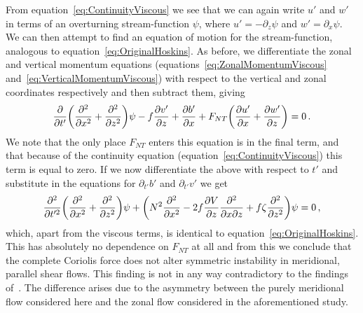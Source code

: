     From equation~\ref{eq:ContinuityViscous} we see that we can again write $u'$ and $w'$ in terms of an overturning stream-function $\psi$, where $u' = - \partial_z \psi$ and $w' = \partial_x \psi$. We can then attempt to find an equation of motion for the stream-function, analogous to equation~\ref{eq:OriginalHoskins}. As before, we differentiate the zonal and vertical momentum equations (equations~\ref{eq:ZonalMomentumViscous} and~\ref{eq:VerticalMomentumViscous}) with respect to the vertical and zonal coordinates respectively and then subtract them, giving
    \begin{equation}
        \pdv{}{t'} \bigg( \pdv[2]{x} + \pdv[2]{z} \bigg) \psi - f \pdv{v'}{z} + \pdv{b'}{x} + F_{NT} \bigg( \pdv{u'}{x} + \pdv{w'}{z} \bigg) = 0 \, .
    \end{equation}
    We note that the only place $F_{NT}$ enters this equation is in the final term, and that because of the continuity equation (equation~\ref{eq:ContinuityViscous}) this term is equal to zero. If we now differentiate the above with respect to $t'$ and substitute in the equations for $\partial_{t'}b'$ and $\partial_{t'}v'$ we get
    \begin{equation}
        \frac{\partial^2}{\partial t'^2} \bigg(\pdv[2]{}{x} + \pdv[2]{}{z}\bigg) \psi + \bigg( N^2 \pdv[2]{}{x} - 2 f \pdv{V}{z} \pdv[2]{}{x}{z} + f \zeta \pdv[2]{}{z} \bigg) \psi = 0 \, ,
    \end{equation}
    which, apart from the viscous terms, is identical to equation~\ref{eq:OriginalHoskins}\footnotemark. This has absolutely no dependence on $F_{NT}$ at all and from this we conclude that the complete Coriolis force does not alter symmetric instability in meridional, parallel shear flows. This finding is not in any way contradictory to the findings of~\citet{Zeitlin2018a}. The difference arises due to the asymmetry between the purely meridional flow considered here and the zonal flow considered in the aforementioned study.

